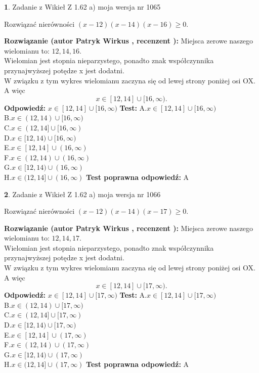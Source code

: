 \documentclass[12pt, a4paper]{article}
\theoremstyle{definition} %
\newtheorem{zad}{}
\newcommand{\zadStart}[1]{\begin{zad}#1\newline}
\newcommand{\zadStop}{\end{zad}}
\newcommand{\rozwStart}[2]{\noindent \textbf{Rozwiązanie (autor #1 , recenzent #2): }\newline}
\newcommand{\rozwStop}{\newline}
\newcommand{\odpStart}{\noindent \textbf{Odpowiedź:}\newline}
\newcommand{\odpStop}{\newline}
\newcommand{\testStart}{\noindent \textbf{Test:}\newline}
\newcommand{\testStop}{\newline}
\newcommand{\kluczStart}{\noindent \textbf{Test poprawna odpowiedź:}\newline}
\newcommand{\kluczStop}{\newline}
\begin{document}
\zadStart{Zadanie z Wikieł Z 1.62 a) moja wersja nr 1065}

Rozwiązać nierówności $(x-12)(x-14)(x-16)\ge0$.
\zadStop
\rozwStart{Patryk Wirkus}{}
Miejsca zerowe naszego wielomianu to: $12, 14, 16$.\\
Wielomian jest stopnia nieparzystego, ponadto znak współczynnika przy\linebreak najwyższej potędze x jest dodatni.\\ W związku z tym wykres wielomianu zaczyna się od lewej strony poniżej osi OX. A więc $$x \in [12,14] \cup [16,\infty).$$
\rozwStop
\odpStart
$x \in [12,14] \cup [16,\infty)$
\odpStop
\testStart
A.$x \in [12,14] \cup [16,\infty)$\\
B.$x \in (12,14) \cup [16,\infty)$\\
C.$x \in (12,14] \cup [16,\infty)$\\
D.$x \in [12,14) \cup [16,\infty)$\\
E.$x \in [12,14] \cup (16,\infty)$\\
F.$x \in (12,14) \cup (16,\infty)$\\
G.$x \in [12,14) \cup (16,\infty)$\\
H.$x \in (12,14] \cup (16,\infty)$
\testStop
\kluczStart
A
\kluczStop



\zadStart{Zadanie z Wikieł Z 1.62 a) moja wersja nr 1066}

Rozwiązać nierówności $(x-12)(x-14)(x-17)\ge0$.
\zadStop
\rozwStart{Patryk Wirkus}{}
Miejsca zerowe naszego wielomianu to: $12, 14, 17$.\\
Wielomian jest stopnia nieparzystego, ponadto znak współczynnika przy\linebreak najwyższej potędze x jest dodatni.\\ W związku z tym wykres wielomianu zaczyna się od lewej strony poniżej osi OX. A więc $$x \in [12,14] \cup [17,\infty).$$
\rozwStop
\odpStart
$x \in [12,14] \cup [17,\infty)$
\odpStop
\testStart
A.$x \in [12,14] \cup [17,\infty)$\\
B.$x \in (12,14) \cup [17,\infty)$\\
C.$x \in (12,14] \cup [17,\infty)$\\
D.$x \in [12,14) \cup [17,\infty)$\\
E.$x \in [12,14] \cup (17,\infty)$\\
F.$x \in (12,14) \cup (17,\infty)$\\
G.$x \in [12,14) \cup (17,\infty)$\\
H.$x \in (12,14] \cup (17,\infty)$
\testStop
\kluczStart
A
\kluczStop
\end{document}
